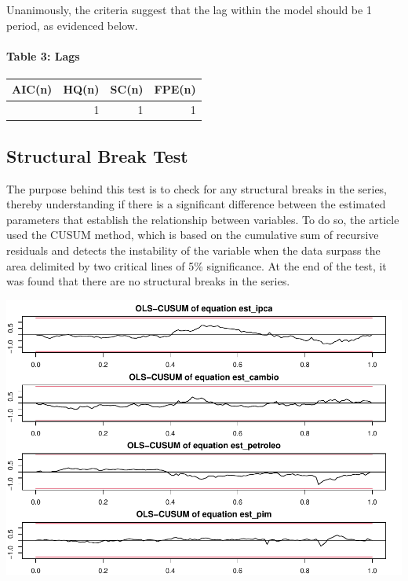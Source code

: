 \documentclass[12pt]{article}
\begin{document}
Unanimously, the criteria suggest that the lag within the model should
be 1 period, as evidenced below.

\hypertarget{table-3-lags}{%
\paragraph{Table 3: Lags}\label{table-3-lags}}

\begin{longtable}[]{@{}rrrr@{}}
\toprule\noalign{}
AIC(n) & HQ(n) & SC(n) & FPE(n) \\
\midrule\noalign{}
\endhead
\bottomrule\noalign{}
\endlastfoot
1 & 1 & 1 & 1 \\
\end{longtable}

\hypertarget{structural-break-test}{%
\subsection{Structural Break Test}\label{structural-break-test}}

The purpose behind this test is to check for any structural breaks in
the series, thereby understanding if there is a significant difference
between the estimated parameters that establish the relationship between
variables. To do so, the article used the CUSUM method, which is based
on the cumulative sum of recursive residuals and detects the instability
of the variable when the data surpass the area delimited by two critical
lines of 5\% significance. At the end of the test, it was found that
there are no structural breaks in the series.

\includegraphics{teste_en_files/figure-latex/unnamed-chunk-4-1.pdf}
\end{document}
